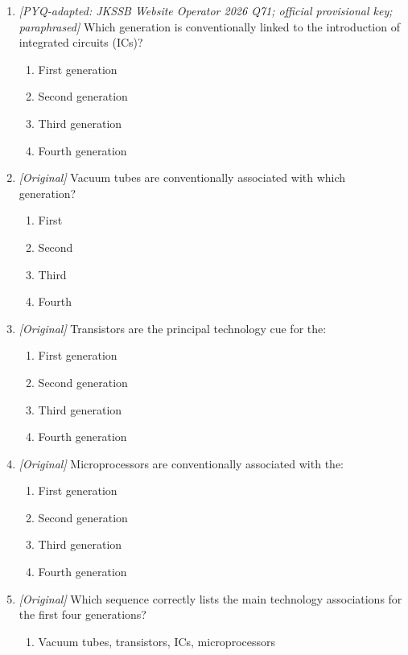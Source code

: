 \begin{enumerate}[label=\textbf{Q\arabic*.}, leftmargin=*]
\item \textit{[PYQ-adapted: JKSSB Website Operator 2026 Q71; official
provisional key; paraphrased]} Which generation is conventionally linked to
the introduction of integrated circuits (ICs)?
  \begin{enumerate}[label=\Alph*.]
    \item First generation
    \item Second generation
    \item Third generation
    \item Fourth generation
  \end{enumerate}
\item \textit{[Original]} Vacuum tubes are conventionally associated with
  which generation?
  \begin{enumerate}[label=\Alph*.]
    \item First
    \item Second
    \item Third
    \item Fourth
  \end{enumerate}
\item \textit{[Original]} Transistors are the principal technology cue for
  the:
  \begin{enumerate}[label=\Alph*.]
    \item First generation
    \item Second generation
    \item Third generation
    \item Fourth generation
  \end{enumerate}
\item \textit{[Original]} Microprocessors are conventionally associated
  with the:
  \begin{enumerate}[label=\Alph*.]
    \item First generation
    \item Second generation
    \item Third generation
    \item Fourth generation
  \end{enumerate}
\item \textit{[Original]} Which sequence correctly lists the main
  technology associations for the first four generations?
  \begin{enumerate}[label=\Alph*.]
    \item Vacuum tubes, transistors, ICs, microprocessors

\end{enumerate}
\end{enumerate}
